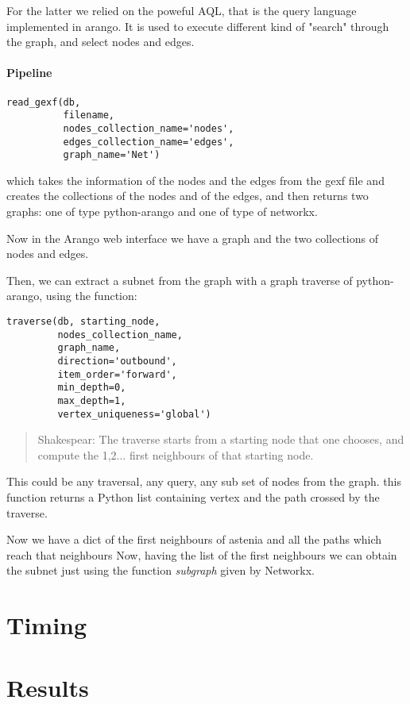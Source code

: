 \documentclass[11pt,twocolumn]{article}
\begin{document}
For the latter we relied on the poweful AQL, that is the query language implemented in arango. It is used to execute different kind of "search" through the graph, and select nodes and edges.


\paragraph{Pipeline}


\begin{verbatim}
read_gexf(db, 
          filename,
          nodes_collection_name='nodes', 
          edges_collection_name='edges',
          graph_name='Net')
\end{verbatim}
which takes the information of the nodes and the edges from the gexf file and creates the collections of the nodes and of the edges, and then returns two graphs: one of type python-arango and one of type of networkx.

Now in the Arango web interface we have a graph and the two collections of nodes and edges.


Then, we can extract a subnet from the graph with a graph traverse of python-arango, using the function:
\begin{verbatim}
traverse(db, starting_node,
         nodes_collection_name,
         graph_name,
         direction='outbound',
         item_order='forward',
         min_depth=0,
         max_depth=1,
         vertex_uniqueness='global')
\end{verbatim}

\begin{quote}{Shakespear:}
The traverse starts from a starting node that one chooses, and compute the 1,2... first neighbours of that starting node.
\end{quote} 
This could be any traversal, any query, any sub set of nodes from the graph.
this function returns a Python list containing vertex and the path crossed by the traverse.

Now we have a dict of the first neighbours of astenia and all the paths which reach that neighbours
Now, having the list of the first neighbours we can obtain the subnet just using the function \textit{subgraph} given by Networkx.


\section{Timing}

\section{Results}
\end{document}

